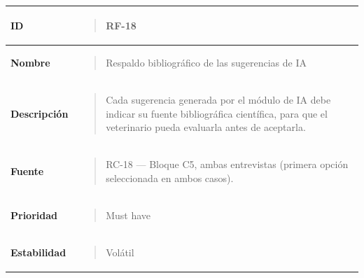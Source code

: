 \documentclass[
]{article}
\newcounter{none} %
\begin{document}
{\def\LTcaptype{none} %
\begin{longtable}[]{@{}
  >{\raggedright\arraybackslash}p{}
  >{\raggedright\arraybackslash}p{}@{}}
\toprule\noalign{}
\begin{minipage}[b]{\linewidth}\raggedright
\textbf{ID}
\end{minipage} & \begin{minipage}[b]{\linewidth}\raggedright
\begin{quote}
RF-18
\end{quote}
\end{minipage} \\
\midrule\noalign{}
\endhead
\bottomrule\noalign{}
\endlastfoot
\textbf{Nombre} & \begin{minipage}[t]{\linewidth}\raggedright
\begin{quote}
Respaldo bibliográfico de las sugerencias de IA
\end{quote}
\end{minipage} \\
\textbf{Descripción} & \begin{minipage}[t]{\linewidth}\raggedright
\begin{quote}
Cada sugerencia generada por el módulo de IA debe indicar su fuente
bibliográfica científica, para que el veterinario pueda evaluarla antes
de aceptarla.
\end{quote}
\end{minipage} \\
\textbf{Fuente} & \begin{minipage}[t]{\linewidth}\raggedright
\begin{quote}
RC-18 --- Bloque C5, ambas entrevistas (primera opción seleccionada en
ambos casos).
\end{quote}
\end{minipage} \\
\textbf{Prioridad} & \begin{minipage}[t]{\linewidth}\raggedright
\begin{quote}
Must have
\end{quote}
\end{minipage} \\
\textbf{Estabilidad} & \begin{minipage}[t]{\linewidth}\raggedright
\begin{quote}
Volátil
\end{quote}
\end{minipage} \\

\end{longtable}}
\end{document}

